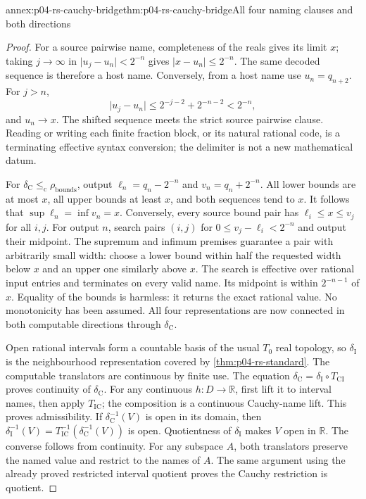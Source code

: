 \begin{annexitem}{annex:p04-rs-cauchy-bridge}{thm:p04-rs-cauchy-bridge}{All four naming clauses and both directions}
\begin{proof}
For a source pairwise name, completeness of the reals gives
its limit \(x\); taking \(j\to\infty\) in
\(\lvert u_j-u_n\rvert<2^{-n}\) gives
\(\lvert x-u_n\rvert\leq2^{-n}\).
The same decoded sequence is therefore a host name.
Conversely, from a host name use \(u_n=q_{n+2}\).
For \(j>n\),
\[
 \lvert u_j-u_n\rvert
 \leq2^{-j-2}+2^{-n-2}<2^{-n},
\]
and \(u_n\to x\). The shifted sequence meets the strict
source pairwise clause. Reading or writing each finite
fraction block, or its natural rational code, is a terminating
effective syntax conversion; the delimiter is not a new
mathematical datum.

For \(\delta_{\mathrm C}\leq_{\mathrm c}\rho_{\mathrm{bounds}}\),
output
\(\ell_n=q_n-2^{-n}\) and \(v_n=q_n+2^{-n}\).
All lower bounds are at most \(x\), all upper bounds at least
\(x\), and both sequences tend to \(x\).
It follows that \(\sup\ell_n=\inf v_n=x\).
Conversely, every source bound pair has
\(\ell_i\leq x\leq v_j\) for all \(i,j\).
For output \(n\), search pairs \((i,j)\) for
\(0\leq v_j-\ell_i<2^{-n}\) and output their midpoint.
The supremum and infimum premises guarantee a pair with
arbitrarily small width: choose a lower bound within half
the requested width below \(x\) and an upper one similarly
above \(x\). The search is effective over rational input
entries and terminates on every valid name.
Its midpoint is within \(2^{-n-1}\) of \(x\).
Equality of the bounds is harmless: it returns the exact
rational value. No monotonicity has been assumed.
All four representations are now connected in both
computable directions through \(\delta_{\mathrm C}\).

Open rational intervals form a countable basis of the usual
\(T_0\) real topology, so \(\delta_{\mathrm I}\) is the
neighbourhood representation covered by
\cref{thm:p04-rs-standard}.
The computable translators are continuous by finite use.
The equation \(\delta_{\mathrm C}
=\delta_{\mathrm I}\circ T_{\mathrm{CI}}\) proves continuity
of \(\delta_{\mathrm C}\).
For any continuous \(h:D\to\mathbb R\), first lift it to
interval names, then apply \(T_{\mathrm{IC}}\); the
composition is a continuous Cauchy-name lift.
This proves admissibility.
If \(\delta_{\mathrm C}^{-1}(V)\) is open in its domain,
then
\(\delta_{\mathrm I}^{-1}(V)
=T_{\mathrm{IC}}^{-1}(\delta_{\mathrm C}^{-1}(V))\)
is open. Quotientness of \(\delta_{\mathrm I}\) makes \(V\)
open in \(\mathbb R\). The converse follows from continuity.
For any subspace \(A\), both translators preserve the named
value and restrict to the names of \(A\).
The same argument using the already proved restricted
interval quotient proves the Cauchy restriction is quotient.
\end{proof}
\end{annexitem}

